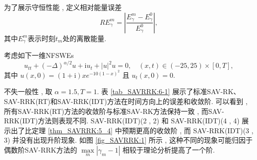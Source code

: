 为了展示守恒性能 , 定义相对能量误差
\begin{equation}\label{eq_SAVRRK:105}
	R E_{\gamma}^{m} = \left|\frac{E_{\gamma}^{m} - E_{\gamma}^{0}}{E_{\gamma}^{0}}\right| , 
\end{equation}
其中$E_{\gamma}^{m}$表示时刻$t_m$处的离散能量.

\begin{example}\label{exp_SAVRRK:1} 
	考虑如下一维NFSWEs\cite{ranLinearlyImplicitConservative2016}
	\begin{equation}\label{eq_SAVRRK:108}
		u_{t t}+(-\Delta)^{\alpha / 2} u+\mathrm{i}u_t+|u|^2 u=0 , \quad (x , t)\in  (-25 , 25)\times[0 , T] , 
	\end{equation}
	其中 $u(x , 0)=(1+\mathrm{i}) x e^{-10(1-x)^2}$ 且 $u_t(x , 0)=0$.
	\end{example}

	不失一般性 , 取 $\alpha=1.5,T=1$.%
	表 \ref{tab_SAVRRK:6-1} 展示了标准SAV-RK、SAV-RRK(RT)和SAV-RRK(IDT)方法在时间方向上的误差和收敛阶.
	可以看到 , 所有SAV-RRK(RT)方法的收敛阶与标准SAV-RK方法保持一致 , 而SAV-RRK(IDT)方法则表现不同.
	SAV-RRK(IDT)(2 , 2) 和 SAV-RRK(IDT)(4 , 4) 展示出了比定理 \ref{thm_SAVRRK:5_4} 中预期更高的收敛阶 , 
	而 SAV-RRK(IDT)(3 , 3) 并没有出现升阶现象. 如图 \ref{fig_SAVRRK:1} 所示 , 
	这种不同的现象可能归因于偶数阶SAV-RRK方法的 $\max\limits _m\left|\gamma_m-1\right|$ 
	相较于理论分析提高了一个阶.

